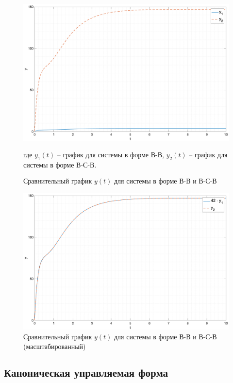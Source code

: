 \begin{figure}[ht!]
    \centering
    \includegraphics[width=\textwidth]{media/cmp_sys1_sys2.png}
    \caption{Сравнительный график $y(t)$ для системы в форме В-В и В-С-В}
    \label{fig:cmp_sys1_sys2}
    где $y_1(t)$ -- график для системы в форме В-В, $y_2(t)$ -- график для системы в форме В-С-В.
\end{figure}

\begin{figure}[ht!]
    \centering
    \includegraphics[width=\textwidth]{media/cmp_sys1_sys2_scaled.png}
    \caption{Сравнительный график $y(t)$ для системы в форме В-В и В-С-В (масштабированный)}
    \label{fig:cmp_sys1_sys2_scaled}
\end{figure}

\FloatBarrier

\subsection{Каноническая управляемая форма}

